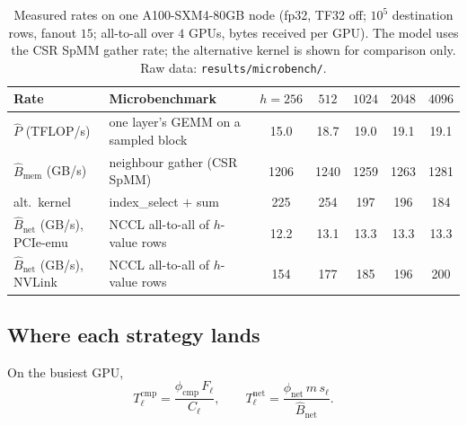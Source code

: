 \begin{table}[h]
\centering
\caption{Measured rates on one A100-SXM4-80GB node (fp32, TF32 off; $10^5$ destination rows,
fanout $15$; all-to-all over $4$ GPUs, bytes received per GPU). The model uses the CSR SpMM
gather rate; the alternative kernel is shown for comparison only. Raw data:
\texttt{results/microbench/}.}
\label{tab:cm-microbench}
\footnotesize
\begin{tabular}{l l c c c c c}
\toprule
Rate & Microbenchmark & $h{=}256$ & $512$ & $1024$ & $2048$ & $4096$ \\
\midrule
$\hat{P}$ (TFLOP/s) & one layer's GEMM on a sampled block
  & 15.0 & 18.7 & 19.0 & 19.1 & 19.1 \\
$\hat{B}_{\mathrm{mem}}$ (GB/s) & neighbour gather (CSR SpMM)
  & 1206 & 1240 & 1259 & 1263 & 1281 \\
\quad alt.\ kernel & index\_select $+$ sum
  & 225 & 254 & 197 & 196 & 184 \\
$\hat{B}_{\mathrm{net}}$ (GB/s), PCIe-emu & NCCL all-to-all of $h$-value rows
  & 12.2 & 13.1 & 13.3 & 13.3 & 13.3 \\
$\hat{B}_{\mathrm{net}}$ (GB/s), NVLink & NCCL all-to-all of $h$-value rows
  & 154 & 177 & 185 & 196 & 200 \\
\bottomrule
\end{tabular}
\end{table}

\subsection{Where each strategy lands}
\label{sec:cm-point}
\label{sec:cm-strategies}

On the busiest GPU,
\begin{equation}
  T^{\mathrm{cmp}}_\ell = \frac{\phi_{\mathrm{cmp}}\, F_\ell}{C_\ell},
  \qquad
  T^{\mathrm{net}}_\ell = \frac{\phi_{\mathrm{net}}\, m\, s_\ell}{\hat{B}_{\mathrm{net}}}.
  \label{eq:cm-times}
\end{equation}

